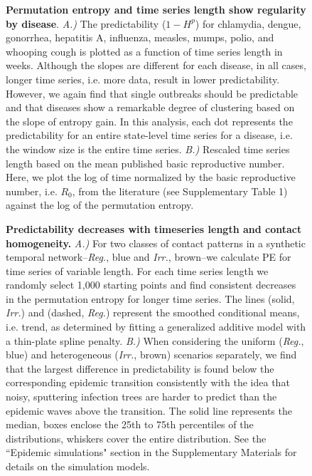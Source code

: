 \documentclass[fleqn,12pt]{wlscirep}
\begin{document}
\begin{figure}[H]
	\centering 
	\caption{\label{fig:bigrambo}\textbf{Permutation entropy and time series length show regularity by disease}.  \textit{A.)} The predictability ($1 - H^p$) for chlamydia, dengue, gonorrhea, hepatitis A, influenza, measles, mumps, polio, and whooping cough is plotted as a function of time series length in weeks.  Although the slopes are different for each disease, in all cases, longer time series, i.e. more data, result in lower predictability.  However, we again find that single outbreaks should be predictable and that diseases show a remarkable degree of clustering based on the slope of entropy gain. In this analysis, each dot represents the predictability for an entire state-level time series for a disease, i.e. the window size is the entire time series. \textit{B.)} Rescaled  time series length based on the mean published basic reproductive number.  Here, we plot the log of time normalized by the basic reproductive number, i.e. $R_0$, from the literature (see Supplementary Table 1) against the log of the permutation entropy.}
\end{figure}

\begin{figure}[H]
	\centering
	\caption{\label{fig:simnets}\textbf{Predictability decreases with timeseries length and contact homogeneity.} 
		\textit{A.)} For two classes of contact patterns in a synthetic temporal network--\textit{Reg.}, blue and \textit{Irr.}, brown--we calculate PE for time series of variable length. For each time series length we randomly select 1,000 starting points and find consistent decreases in the permutation entropy for longer time series. The lines (solid, \textit{Irr.}) and (dashed, \textit{Reg.}) represent the smoothed conditional means, i.e. trend, as determined by fitting a generalized additive model with a thin-plate spline penalty. \textit{B.)} When considering the uniform (\textit{Reg.}, blue) and heterogeneous (\textit{Irr.}, brown) scenarios separately, we find that the largest difference in predictability is found below the corresponding epidemic transition consistently with the idea that noisy, sputtering infection trees are harder to predict than the epidemic waves above the transition. The solid line represents the median, boxes enclose the 25th to 75th percentiles of the distributions, whiskers cover the entire distribution. See the ``Epidemic simulations" section in the Supplementary Materials for details on the simulation models.}
\end{figure} 
\end{document}
